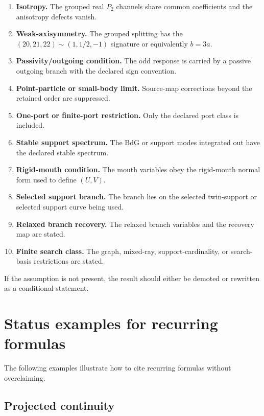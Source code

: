\begin{enumerate}[leftmargin=2.2em]
  \item \textbf{Isotropy.}  The grouped real \(P_2\) channels share common coefficients and the anisotropy defects vanish.
  \item \textbf{Weak-axisymmetry.}  The grouped splitting has the \((20,21,22)\sim(1,1/2,-1)\) signature or equivalently \(b=3a\).
  \item \textbf{Passivity/outgoing condition.}  The odd response is carried by a passive outgoing branch with the declared sign convention.
  \item \textbf{Point-particle or small-body limit.}  Source-map corrections beyond the retained order are suppressed.
  \item \textbf{One-port or finite-port restriction.}  Only the declared port class is included.
  \item \textbf{Stable support spectrum.}  The BdG or support modes integrated out have the declared stable spectrum.
  \item \textbf{Rigid-mouth condition.}  The mouth variables obey the rigid-mouth normal form used to define \((U,V)\).
  \item \textbf{Selected support branch.}  The branch lies on the selected twin-support or selected support curve being used.
  \item \textbf{Relaxed branch recovery.}  The relaxed branch variables and the recovery map are stated.
  \item \textbf{Finite search class.}  The graph, mixed-ray, support-cardinality, or search-basis restrictions are stated.
\end{enumerate}

If the assumption is not present, the result should either be demoted or rewritten as a conditional statement.

\section{Status examples for recurring formulas}
\label{sec:status-examples-recurring-formulas}

The following examples illustrate how to cite recurring formulas without overclaiming.

\subsection{Projected continuity}
\label{subsec:status-projected-continuity}

